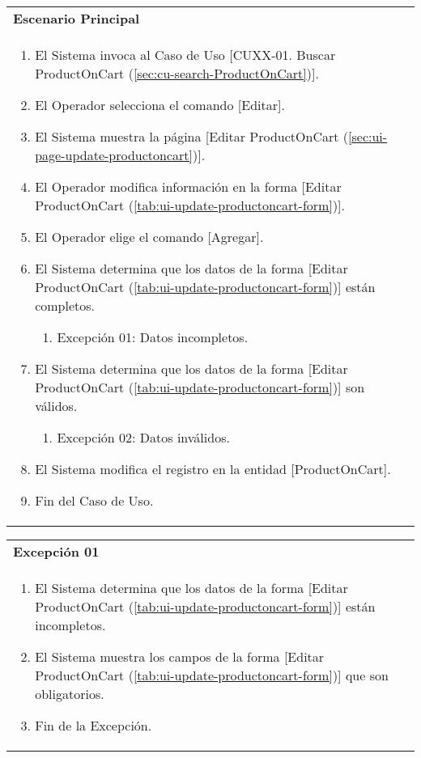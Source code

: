 	\begin{tabular}{ p{15.5cm} }
		\textbf{Escenario Principal} \\
		\begin{enumerate}
			\item El Sistema invoca al Caso de Uso [CUXX-01. Buscar ProductOnCart (\ref{sec:cu-search-ProductOnCart})].
			\item El Operador selecciona el comando [Editar].
			\item El Sistema muestra la p\'agina [Editar ProductOnCart (\ref{sec:ui-page-update-productoncart})].
			\item El Operador modifica informaci\'on en la forma [Editar ProductOnCart (\ref{tab:ui-update-productoncart-form})].
			\item El Operador elige el comando [Agregar].
			\item El Sistema determina que los datos de la forma [Editar ProductOnCart (\ref{tab:ui-update-productoncart-form})] est\'an completos.
				\begin{enumerate}
					\item Excepci\'on 01: Datos incompletos.
				\end{enumerate}
			\item El Sistema determina que los datos de la forma [Editar ProductOnCart (\ref{tab:ui-update-productoncart-form})] son v\'alidos.
				\begin{enumerate}
					\item Excepci\'on 02: Datos inv\'alidos.
				\end{enumerate}
			\item El Sistema modifica el registro en la entidad [ProductOnCart].
			\item Fin del Caso de Uso.
		\end{enumerate}
	\end{tabular}
	
	\begin{tabular}{ p{15.5cm} }
		\textbf{Excepci\'on 01} \\
		\begin{enumerate}
			\item El Sistema determina que los datos de la forma [Editar ProductOnCart (\ref{tab:ui-update-productoncart-form})] est\'an incompletos.
			\item El Sistema muestra los campos de la forma [Editar ProductOnCart (\ref{tab:ui-update-productoncart-form})] que son obligatorios.
			\item Fin de la Excepci\'on.
		\end{enumerate}
	\end{tabular}
	
